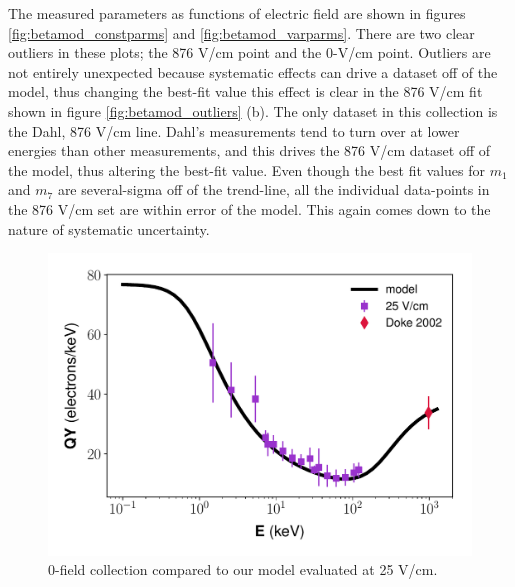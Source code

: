 The measured parameters as functions of electric field are shown in figures \ref{fig:betamod_constparms} and \ref{fig:betamod_varparms}. There are two clear outliers in these plots; the 876 V/cm point and the 0-V/cm point. Outliers are not entirely unexpected because systematic effects can drive a dataset off of the model, thus changing the best-fit value this effect is clear in the 876 V/cm fit shown in figure \ref{fig:betamod_outliers} (b). The only dataset in this collection is the Dahl, 876 V/cm line. Dahl's measurements tend to turn over at lower energies than other measurements, and this drives the 876 V/cm dataset off of the model, thus altering the best-fit value. Even though the best fit values for $m_1$ and $m_7$ are several-sigma off of the trend-line, all the individual data-points in the 876 V/cm set are within error of the model. This again comes down to the nature of systematic uncertainty.
\begin{figure}[!h]
\centering
\includegraphics[width=\linewidth]{Figures/Yields_fit_new/NEST_fit_25Vcm_new.pdf}
\caption{0-field collection compared to our model evaluated at 25 V/cm.}
\label{fig:betamod_25Vcm}
\end{figure}

